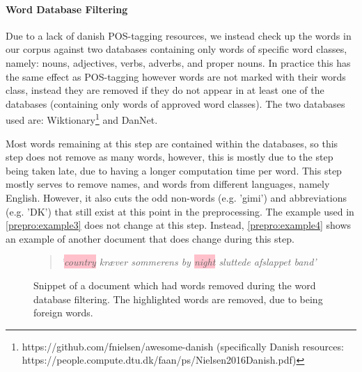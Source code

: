\paragraph{Word Database Filtering}
Due to a lack of danish POS-tagging resources, we instead check up the words in our corpus against two databases containing only words of specific word classes, namely: nouns, adjectives, verbs, adverbs, and proper nouns.
In practice this has the same effect as POS-tagging however words are not marked with their words class, instead they are removed if they do not appear in at least one of the databases (containing only words of approved word classes).
The two databases used are:  Wiktionary\footnote{https://github.com/fnielsen/awesome-danish (specifically Danish resources: https://people.compute.dtu.dk/faan/ps/Nielsen2016Danish.pdf)} and DanNet\cite{Pedersen2009DanNetTC}. 

Most words remaining at this step are contained within the databases, so this step does not remove as many words, however, this is mostly due to the step being taken late, due to having a longer computation time per word.
This step mostly serves to remove names, and words from different languages, namely English.
However, it also cuts the odd non-words (e.g. 'gimi') and abbreviations (e.g. 'DK') that still exist at this point in the preprocessing.
The example used in \autoref{prepro:example3} does not change at this step. 
Instead, \autoref{prepro:example4} shows an example of another document that does change during this step.

\begin{figure}[h]
	\begin{quote}
		\textit{
			'\colorbox{pink}{country} kræver sommerens by \colorbox{pink}{night} sluttede afslappet band'
		}
	\end{quote}
	\caption{Snippet of a document which had words removed during the word database filtering. The highlighted words are removed, due to being foreign words.}
	\label{prepro:example4}
\end{figure}

